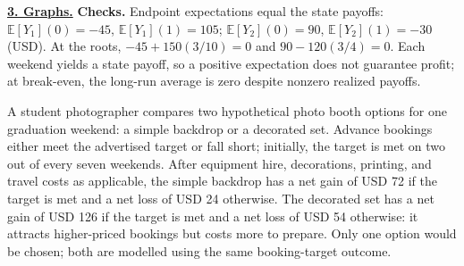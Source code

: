 \vspace{2mm}
\textbf{\underline{3. Graphs.}}\vspace{2mm}
\textbf{Checks.} Endpoint expectations equal the state payoffs:
$\mathbb E[Y_1](0)=-45$, $\mathbb E[Y_1](1)=105$;
$\mathbb E[Y_2](0)=90$, $\mathbb E[Y_2](1)=-30$ (USD).
At the roots, $-45+150(3/10)=0$ and $90-120(3/4)=0$.
Each weekend yields a state payoff, so a positive expectation does not guarantee profit;
at break-even, the long-run average is zero despite nonzero realized payoffs.

\par\clearpage
\endgroup

A student photographer compares two hypothetical photo booth options for one graduation
weekend: a simple backdrop or a decorated set. Advance bookings either meet the advertised
target or fall short; initially, the target is met on two out of every seven weekends.
After equipment hire, decorations, printing, and travel costs as applicable, the simple
backdrop has a net gain of USD 72 if the target is met and a net loss of USD 24 otherwise.
The decorated set has a net gain of USD 126 if the target is met and a net loss of USD 54
otherwise: it attracts higher-priced bookings but costs more to prepare. Only one option
would be chosen; both are modelled using the same booking-target outcome.


\begingroup
\newcommand{\subtaskheading}[2]{%
    \par\Needspace{5\baselineskip}\addvspace{2pt}%
    \noindent\textbf{\underline{#1. #2.}}\par\nopagebreak[4]}
\newcommand{\writingbox}[2][6mm]{%
  \tikz[baseline=(answer.base)]{\node[draw=black!25,fill=black!1,
    rounded corners=2mm,line width=.3pt,inner sep=0pt,outer sep=.3pt,
    minimum width=#2,minimum height=#1] (answer) {\phantom{0}};}}
\renewcommand{\calcblank}{\writingbox[6mm]{11mm}}
\renewcommand{\shortblank}{\writingbox{7.5mm}}
\newcommand{\probblank}{\writingbox[8mm]{11mm}}
\newcommand{\wordblank}[1]{\writingbox[7mm]{#1}}
\setlength{\parskip}{0pt}\setlength{\jot}{0pt}\setlength{\arraycolsep}{2.5pt}
\setlength{\abovedisplayskip}{3pt}
\setlength{\belowdisplayskip}{3pt}
\setlength{\abovedisplayshortskip}{3pt}
\setlength{\belowdisplayshortskip}{3pt}

